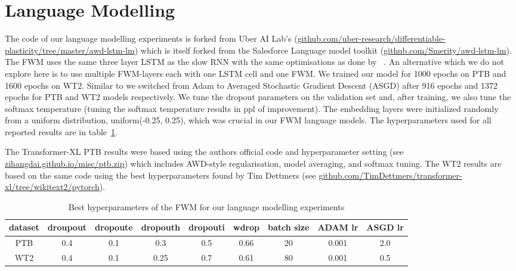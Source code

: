 \documentclass{article} \usepackage{iclr2021_conference,times}
\begin{document}
\section{Language Modelling}
\label{appendix:sec:LM}
The code of our language modelling experiments is forked from Uber AI Lab's (\href{https://github.com/uber-research/differentiable-plasticity/tree/master/awd-lstm-lm}{github.com/uber-research/differentiable-plasticity/tree/master/awd-lstm-lm}) which is itself forked from the Salesforce Language model toolkit (\href{https://github.com/Smerity/awd-lstm-lm}{github.com/Smerity/awd-lstm-lm}). The FWM uses the same three layer LSTM as the slow RNN with the same optimisations as done by ~\citet{merity2018regularizing}.
An alternative which we do not explore here is to use multiple FWM-layers each with one LSTM cell and one FWM.
We trained our model for 1000 epochs on PTB and 1600 epochs on WT2. 
Similar to \citet{merity2018regularizing} we switched from Adam to Averaged Stochastic Gradient Descent (ASGD) after 916 epochs and 1372 epochs for PTB and WT2 models respectively.
We tune the dropout parameters on the validation set and, after training, we also tune the softmax temperature (tuning the softmax temperature results in  ppl of improvement). 
The embedding layers were initialized randomly from a uniform distribution, uniform(-0.25, 0.25), which was crucial in our FWM language models. 
The hyperparameters used for all reported results are in table~\ref{appendix:tbl:lmparams}.

The Transformer-XL PTB results were based using the authors official code and hyperparameter setting (see \href{http://zihangdai.github.io/misc/ptb.zip}{zihangdai.github.io/misc/ptb.zip}) which includes AWD-style regularisation, model averaging, and softmax tuning. The WT2 results are based on the same code using the best hyperparameters found by Tim Dettmers (see \href{https://github.com/TimDettmers/transformer-xl/tree/wikitext2/pytorch}{github.com/TimDettmers/transformer-xl/tree/wikitext2/pytorch}). 
\begin{table}[h]
\caption{Best hyperparameters of the FWM for our language modelling experiments}
  \centering
  \setlength{\tabcolsep}{0.15cm}
  \begin{tabular}{ccccccccc}
    \toprule
    dataset & droupout & dropoute & dropouth & dropouti & wdrop & batch size & ADAM lr & ASGD lr \\
    \midrule
    PTB & 0.4 & 0.1 & 0.3 & 0.5 & 0.66 & 20 & 0.001 & 2.0 \\
    WT2 & 0.4 & 0.1 & 0.25 & 0.7 & 0.61 & 80 & 0.001 & 0.5 \\
    \bottomrule
  \end{tabular}
  \label{appendix:tbl:lmparams}
\end{table}
\end{document}
